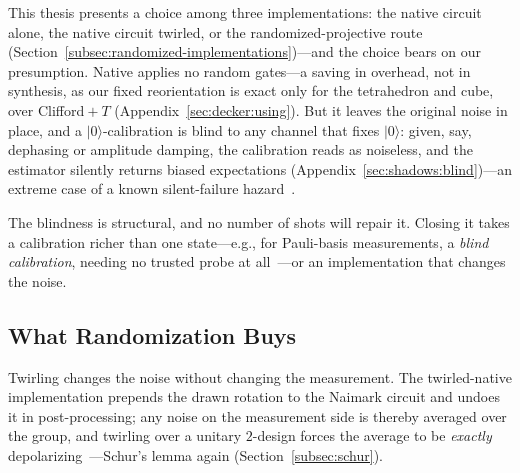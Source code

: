\documentclass[11pt, oneside, openany]{scrbook}
\newcommand{\ket}[1]{|#1\rangle}
\begin{document}
This thesis presents a choice among three implementations: the native circuit alone, the native circuit twirled, or the randomized-projective route (Section~\ref{subsec:randomized-implementations})---and the choice bears on our presumption. Native applies no random gates---a saving in overhead, not in synthesis, as our fixed reorientation is exact only for the tetrahedron and cube, over Clifford${}+T$ (Appendix~\ref{sec:decker:using}). But it leaves the original noise in place, and a $\ket{0}$-calibration is blind to any channel that fixes $\ket{0}$: given, say, dephasing or amplitude damping, the calibration reads as noiseless, and the estimator silently returns biased expectations (Appendix~\ref{sec:shadows:blind})---an extreme case of a known silent-failure hazard~\cite{brieger2025stabilityclassicalshadowsa}.

The blindness is structural, and no number of shots will repair it. Closing it takes a calibration richer than one state---e.g., for Pauli-basis measurements, a \textit{blind calibration}, needing no trusted probe at all~\cite{jeanette2026blindcalibrationquantum}---or an implementation that changes the noise.

\subsection{What Randomization Buys} \label{sec:povmsinuse:randomizing}

Twirling changes the noise without changing the measurement. The twirled-native implementation prepends the drawn rotation to the Naimark circuit and undoes it in post-processing; any noise on the measurement side is thereby averaged over the group, and twirling over a unitary $2$-design forces the average to be \textit{exactly} depolarizing~\cite{dankert2009exactapproximateunitary}---Schur's lemma again (Section~\ref{subsec:schur}).
\end{document}
